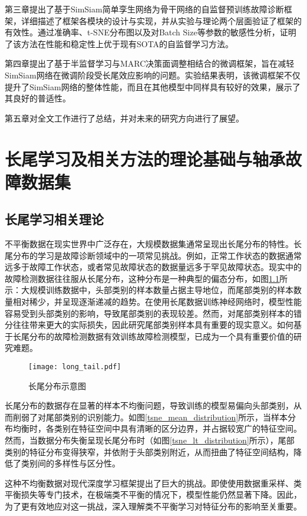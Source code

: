 \documentclass[master]{thesis-uestc}
\begin{document}
第三章提出了基于SimSiam简单孪生网络为骨干网络的自监督预训练故障诊断框架，详细描述了框架各模块的设计与实现，并从实验与理论两个层面验证了框架的有效性。通过准确率、t-SNE分布图以及对Batch Size等参数的敏感性分析，证明了该方法在性能和稳定性上优于现有SOTA的自监督学习方法。

第四章提出了基于半监督学习与MARC决策面调整相结合的微调框架，旨在减轻SimSiam网络在微调阶段受长尾效应影响的问题。实验结果表明，该微调框架不仅提升了SimSiam网络的整体性能，而且在其他模型中同样具有较好的效果，展示了其良好的普适性。

第五章对全文工作进行了总结，并对未来的研究方向进行了展望。


\chapter{长尾学习及相关方法的理论基础与轴承故障数据集}
\section{长尾学习相关理论}
不平衡数据在现实世界中广泛存在，大规模数据集通常呈现出长尾分布的特性。长尾分布的学习是故障诊断领域中的一项常见挑战。例如，正常工作状态的数据通常远多于故障工作状态，或者常见故障状态的数据量远多于罕见故障状态。现实中的故障检测数据往往服从长尾分布，这种分布是一种典型的偏态分布，如图\ref{fig_long_tail}所示：大规模训练数据中，头部类别的样本数量占据主导地位，而尾部类别的样本数量相对稀少，并呈现逐渐递减的趋势。在使用长尾数据训练神经网络时，模型性能容易受到头部类别的影响，导致尾部类别的表现较差。然而，对尾部类别样本的错分往往带来更大的实际损失，因此研究尾部类别样本具有重要的现实意义。如何基于长尾分布的故障检测数据有效训练故障检测模型，已成为一个具有重要价值的研究难题。
\begin{figure}[h]
    \texttt{[image: long\_tail.pdf]}
    \caption{长尾分布示意图}
    \label{fig_long_tail}
\end{figure}

长尾分布的数据存在显著的样本不均衡问题，导致训练的模型易偏向头部类别，从而削弱了对尾部类别的识别能力。如图\ref{tsne_mean_distribution}所示，当样本分布均衡时，各类别在特征空间中具有清晰的区分边界，并占据较宽广的特征空间。然而，当数据分布失衡呈现长尾分布时（如图\ref{tsne_lt_distribution}所示），尾部类别的特征分布变得狭窄，并依附于头部类别附近，从而扭曲了特征空间结构，降低了类别间的多样性与区分性。

这种不均衡数据对现代深度学习框架提出了巨大的挑战。即使使用数据重采样、类平衡损失等专门技术，在极端类不平衡的情况下，模型性能仍然显著下降。因此，为了更有效地应对这一挑战，深入理解类不平衡学习对特征分布的影响至关重要。
\end{document}
